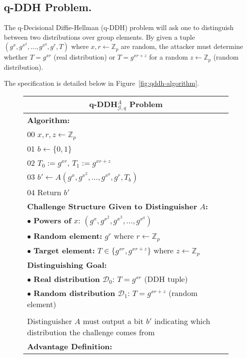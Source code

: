 





\subsection{q-DDH Problem.} The q-Decisional Diffie-Hellman (q-DDH) problem will ask one to distinguish between two distributions over group elements. 
By given a tuple $(g^x, g^{x^2}, \ldots, g^{x^q}, g^r, T)$ where $x, r \leftarrow \mathbb{Z}_p$ are random, the attacker must determine whether $T = g^{xr}$ (real distribution) or $T = g^{xr+z}$ for a random $z \leftarrow \mathbb{Z}_p$ (random distribution).

The specification\cite{fuchsbauer2018} is detailed below in Figure~\ref{fig:qddh-algorithm}.


\begin{figure}[H]
\centering
\footnotesize
\begin{tabular}{|p{15cm}|}
\hline
\multicolumn{1}{|c|}{\textbf{q-DDH$_{\mathcal{G},q}^A$ Problem}} \\
\hline
\textbf{Algorithm:} \\
00 $x, r, z \leftarrow \mathbb{Z}_p$ \\
01 $b \leftarrow \{0,1\}$ \\
02 $T_0 := g^{xr}$, $T_1 := g^{xr+z}$ \\
03 $b' \leftarrow A(g^x, g^{x^2}, \ldots, g^{x^q}, g^r, T_b)$ \\
04 Return $b'$ \\
\hline
\textbf{Challenge Structure Given to Distinguisher } $A$\textbf{:} \\
$\bullet$ \textbf{Powers of } $x$: $(g^x, g^{x^2}, g^{x^3}, \ldots, g^{x^q})$ \\
$\bullet$ \textbf{Random element:} $g^r$ where $r \leftarrow \mathbb{Z}_p$ \\
$\bullet$ \textbf{Target element:} $T \in \{g^{xr}, g^{xr+z}\}$ where $z \leftarrow \mathbb{Z}_p$ \\
\hline
\textbf{Distinguishing Goal:} \\
$\bullet$ \textbf{Real distribution } $\mathcal{D}_0$: $T = g^{xr}$ (DDH tuple) \\
$\bullet$ \textbf{Random distribution } $\mathcal{D}_1$: $T = g^{xr+z}$ (random element) \\
\\
Distinguisher $A$ must output a bit $b'$ indicating which distribution the challenge comes from \\
\hline
\textbf{Advantage Definition:} \\

\end{tabular}
\end{figure}
